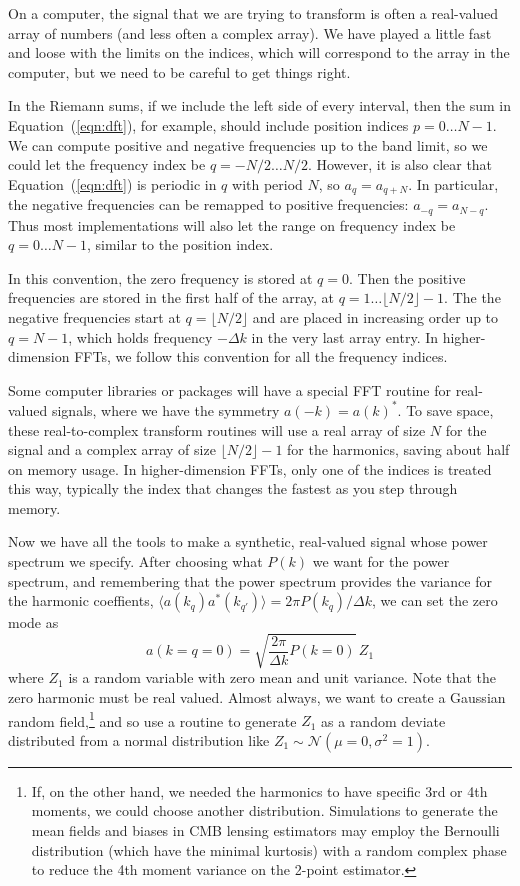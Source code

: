 On a computer, the signal that we are trying to transform is often a real-valued array of numbers (and less often a complex array).  We have played a little fast and loose with the limits on the indices, which will correspond to the array in the computer, but we need to be careful to get things right.

In the Riemann sums, if we include the left side of every interval, then the sum in Equation~(\ref{eqn:dft}), for example, should include position indices $p = 0 \dots N-1$.  We can compute positive and negative frequencies up to the band limit, so we could let the frequency index be $q = -N/2 \dots N/2$.  However, it is also clear that Equation~(\ref{eqn:dft}) is periodic in $q$ with period $N$, so $a_q = a_{q+N}$.  In particular, the negative frequencies can be remapped to positive frequencies: $a_{-q} = a_{N-q}$.  Thus most implementations will also let the range on frequency index be $q = 0 \dots N-1$, similar to the position index.

In this convention, the zero frequency is stored at $q=0$.  Then the positive frequencies are stored in the first half of the array, at $q=1 \dots \lfloor N/2 \rfloor -1$.  The the negative frequencies start at $q =  \lfloor N/2 \rfloor$ and are placed in increasing order up to $q = N-1$, which holds frequency $-\Delta k$ in the very last array entry.  In higher-dimension FFTs, we follow this convention for all the frequency indices.

Some computer libraries or packages will have a special FFT routine for real-valued signals, where we have the symmetry $a(-k) = a(k)^*$.    To save space, these real-to-complex transform routines will use a real array of size $N$ for the signal and a complex array of size $\lfloor N/2 \rfloor - 1$ for the harmonics, saving about half on memory usage.  In higher-dimension FFTs, only one of the indices is treated this way, typically the index that changes the fastest as you step through memory.

Now we have all the tools to make a synthetic, real-valued signal whose power spectrum we specify.  After choosing what $P(k)$ we want for the power spectrum, and remembering that the power spectrum provides the variance for the harmonic coeffients, $ \langle a(k_q) a^*(k_{q'}) \rangle = 2\pi P(k_q) / \Delta k$, we can set the zero mode as
\begin{equation}
  a(k = q =0) =  \sqrt{\frac{2\pi}{\Delta k } P(k = 0)}\, Z_1
\end{equation}
where $Z_1$ is a random variable with zero mean and unit variance.  Note that the zero harmonic must be real valued.  Almost always, we want to create a Gaussian random field,\footnote{If, on the other hand, we needed the harmonics to have specific 3rd or 4th moments, we could choose another distribution.  Simulations to generate the mean fields and biases in CMB lensing estimators may employ the Bernoulli distribution (which have the minimal kurtosis) with a random complex phase to reduce the 4th moment variance on the 2-point estimator.} and so use a routine to generate $Z_1$ as a random deviate distributed from a normal distribution like $Z_1 \sim {\mathcal N}(\mu = 0, \sigma^2 = 1)$.

